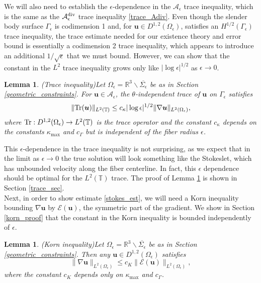 \documentclass[11pt]{article}
\numberwithin{equation}{section}
\newcommand{\R}{\mathbb{R}}
\newcommand{\T}{\mathbb{T}}
\newcommand{\A}{\mathcal{A}}
\newcommand{\E}{\mathcal{E}}
\newcommand{\bu}{\bm{u}}
\newcommand{\dive}{{\rm{div}}}
\newtheorem{lemma}[theorem]{Lemma}
\theoremstyle{definition}
\begin{document}
We will also need to establish the $\epsilon$-dependence in the $\A_\epsilon$ trace inequality, which is the same as the $\A_\epsilon^\dive$ trace inequality \eqref{trace_Adiv}. Even though the slender body surface $\Gamma_{\epsilon}$ is codimension 1 and, for $\bu\in D^{1,2}(\Omega_{\epsilon})$, satisfies an $H^{1/2}(\Gamma_{\epsilon})$ trace inequality, the trace estimate needed for our existence theory and error bound is essentially a codimension 2 trace inequality, which appears to introduce an additional $1/\sqrt{\epsilon}$ that we must bound. However, we can show that the constant in the $L^2$ trace inequality grows only like $|\log\epsilon|^{1/2}$ as $\epsilon\to 0$.
\begin{lemma}\emph{(Trace inequality)}\label{Trace_inequality}
Let $\Omega_\epsilon = \R^3\backslash \overline{\Sigma_\epsilon}$ be as in Section \ref{geometric_constraints}. For $\bu\in \A_{\epsilon}$, the $\theta$-independent trace of $\bu$ on $\Gamma_{\epsilon}$ satisfies 
\begin{equation}\label{Trace_ineq} 
\|{\rm Tr}(\bu)\|_{L^2(\T)} \le c_{\kappa} |\log\epsilon|^{1/2} \| \nabla \bu\|_{L^2(\Omega_{\epsilon})}, 
\end{equation}
where ${\rm Tr} : D^{1,2}(\Omega_{\epsilon}) \to L^2(\T)$ is the trace operator and the constant $c_{\kappa}$ depends on the constants $\kappa_{\max}$ and $c_{\Gamma}$ but is independent of the fiber radius $\epsilon$. 
\end{lemma}

This $\epsilon$-dependence in the trace inequality is not surprising, as we expect that in the limit as $\epsilon\to 0$ the true solution will look something like the Stokeslet, which has unbounded velocity along the fiber centerline. In fact, this $\epsilon$ dependence should be optimal for the $L^2(\T)$ trace. The proof of Lemma \ref{Trace_inequality} is shown in Section \ref{trace_sec}. \\


Next, in order to show estimate \eqref{stokes_est}, we will need a Korn inequality bounding $\nabla \bu$ by $\E(\bu)$, the symmetric part of the gradient. We show in Section \ref{korn_proof} that the constant in the Korn inequality is bounded independently of $\epsilon$. 
\begin{lemma}\emph{(Korn inequality)}\label{korn_eps}
Let $\Omega_{\epsilon}=\R^3 \backslash \overline{\Sigma_{\epsilon}}$ be as in Section \ref{geometric_constraints}. Then any $\bu\in D^{1,2}(\Omega_{\epsilon})$ satisfies 
\begin{equation}\label{korn_ineq}
 \|\nabla \bu\|_{L^2(\Omega_{\epsilon})} \le c_K\|\E(\bu)\|_{L^2(\Omega_{\epsilon})}, 
 \end{equation}
 where the constant $c_K$ depends only on $\kappa_{\max}$ and $c_{\Gamma}$.
\end{lemma}
\end{document}
